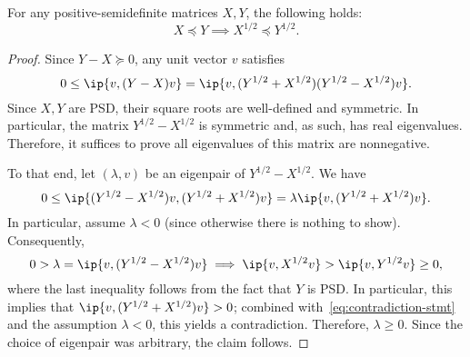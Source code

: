 \begin{lemma}\label{lemma:order-preserving-square-root}
For any positive-semidefinite matrices $X, Y$, the following holds:
\begin{equation}
    X \preceq Y \implies X^{1/2} \preceq Y^{1/2}.
    \label{eq:sqrt-order-preserving}
\end{equation}
\end{lemma}
\begin{proof}
    Since $Y - X \succeq 0$, any unit vector $v$ satisfies
    \[
    0 \leq \ip{v, (Y - X) v} = \ip{v, (Y^{1/2} + X^{1/2})(Y^{1/2} - X^{1/2})v}.
    \]
    Since $X, Y$ are PSD, their square roots are well-defined and
    symmetric. In particular, the matrix $Y^{1/2} - X^{1/2}$ is symmetric and, as such, has real eigenvalues. Therefore, it suffices to prove all eigenvalues of this matrix are nonnegative.

    To that end, let $(\lambda, v)$ be an eigenpair of $Y^{1/2} - X^{1/2}$. We have
    \begin{equation}
    0 \leq \ip{(Y^{1/2} - X^{1/2})v, (Y^{1/2} + X^{1/2}) v} =
    \lambda \ip{v, (Y^{1/2} + X^{1/2}) v}.
    \label{eq:contradiction-stmt}
    \end{equation}
    In particular, assume $\lambda < 0$ (since otherwise there is nothing to show). Consequently,
    \[
    0 > \lambda = \ip{v, (Y^{1/2} - X^{1/2})v} \implies
    \ip{v, X^{1/2} v} > \ip{v, Y^{1/2} v} \geq 0,
    \]
    where the last inequality follows from the fact that $Y$ is PSD.
    In particular, this implies that $\ip{v, (Y^{1/2} + X^{1/2}) v} > 0$;
    combined with~\eqref{eq:contradiction-stmt} and the assumption
    $\lambda < 0$, this yields a contradiction. Therefore, $\lambda \geq 0$. Since the choice of eigenpair was arbitrary, the claim
    follows.
\end{proof}

